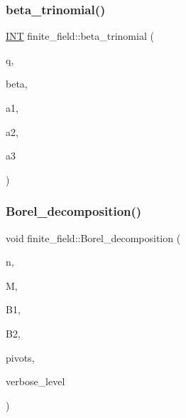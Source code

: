 \mbox{\label{classfinite__field_a990ea3ad3bb9dcf0c4a5b8ebf1cdaebe}} 
\subsubsection{\texorpdfstring{beta\+\_\+trinomial()}{beta\_trinomial()}}
{\footnotesize\ttfamily \mbox{\hyperlink{galois_8h_a09fddde158a3a20bd2dcadb609de11dc}{I\+NT}} finite\+\_\+field\+::beta\+\_\+trinomial (\begin{DoxyParamCaption}\item[{\mbox{\hyperlink{galois_8h_a09fddde158a3a20bd2dcadb609de11dc}{I\+NT}}}]{q,  }\item[{\mbox{\hyperlink{galois_8h_a09fddde158a3a20bd2dcadb609de11dc}{I\+NT}}}]{beta,  }\item[{\mbox{\hyperlink{galois_8h_a09fddde158a3a20bd2dcadb609de11dc}{I\+NT}}}]{a1,  }\item[{\mbox{\hyperlink{galois_8h_a09fddde158a3a20bd2dcadb609de11dc}{I\+NT}}}]{a2,  }\item[{\mbox{\hyperlink{galois_8h_a09fddde158a3a20bd2dcadb609de11dc}{I\+NT}}}]{a3 }\end{DoxyParamCaption})}

\mbox{\label{classfinite__field_a7f7196a414a82039ad8f0866c8fd3225}} 
\subsubsection{\texorpdfstring{Borel\+\_\+decomposition()}{Borel\_decomposition()}}
{\footnotesize\ttfamily void finite\+\_\+field\+::\+Borel\+\_\+decomposition (\begin{DoxyParamCaption}\item[{\mbox{\hyperlink{galois_8h_a09fddde158a3a20bd2dcadb609de11dc}{I\+NT}}}]{n,  }\item[{\mbox{\hyperlink{galois_8h_a09fddde158a3a20bd2dcadb609de11dc}{I\+NT}} $\ast$}]{M,  }\item[{\mbox{\hyperlink{galois_8h_a09fddde158a3a20bd2dcadb609de11dc}{I\+NT}} $\ast$}]{B1,  }\item[{\mbox{\hyperlink{galois_8h_a09fddde158a3a20bd2dcadb609de11dc}{I\+NT}} $\ast$}]{B2,  }\item[{\mbox{\hyperlink{galois_8h_a09fddde158a3a20bd2dcadb609de11dc}{I\+NT}} $\ast$}]{pivots,  }\item[{\mbox{\hyperlink{galois_8h_a09fddde158a3a20bd2dcadb609de11dc}{I\+NT}}}]{verbose\+\_\+level }\end{DoxyParamCaption})}


